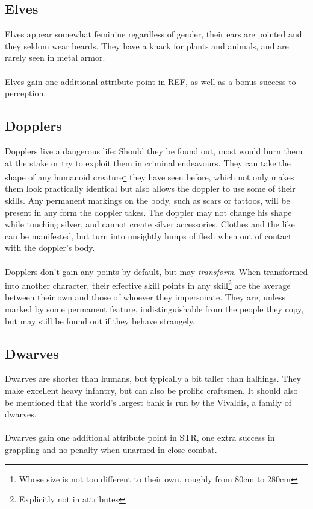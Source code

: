 \documentclass[parskip=full,11pt,%
footheight=38pt]{scrreport}
\begin{document}
\subsection{Elves}
Elves appear somewhat feminine regardless of gender, their ears are pointed and they seldom
wear beards. They have a knack for plants and animals, and are rarely seen in metal armor.
\\\\
Elves gain one additional attribute point in REF, as well as a bonus success to perception.

\subsection{Dopplers}
Dopplers live a dangerous life: Should they be found out, most would burn them at the stake or try to exploit them in criminal endeavours.
They can take the shape of any humanoid creature\footnote{Whose size is not too different to their own, roughly from 80cm to 280cm} they have seen before, which not only makes them look practically identical but also allows the
doppler to use some of their skills. Any permanent markings on the body, such as scars or tattoos, will be present in any form the doppler takes.
The doppler may not change his shape while touching silver, and cannot create silver accessories. Clothes and the like can be manifested,
but turn into unsightly lumps of flesh when out of contact with the doppler's body.
\\\\
Dopplers don't gain any points by default, but may \textit{transform}. When transformed into another character, their effective skill points in
any skill\footnote{Explicitly not in attributes} are the average between their own and those of whoever they impersonate. They are, unless marked
by some permanent feature, indistinguishable from the people they copy, but may still be found out if they behave strangely.

\subsection{Dwarves}
Dwarves are shorter than humans, but typically a bit taller than halflings. They make excellent
heavy infantry, but can also be prolific craftsmen. It should also be mentioned that the world's
largest bank is run by the Vivaldis, a family of dwarves.
\\\\
Dwarves gain one additional attribute point in STR, one extra success in grappling and no penalty
when unarmed in close combat.
\end{document}
